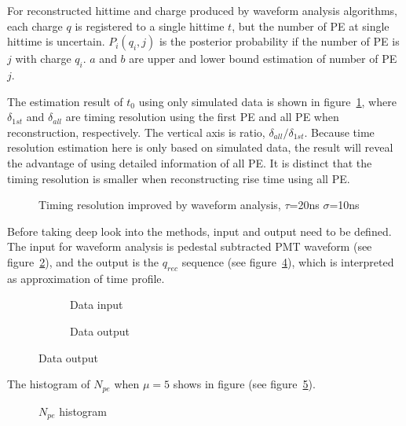 For reconstructed hittime and charge produced by waveform analysis algorithms, each charge $q$ is registered to a single hittime $t$, but the number of PE at single hittime is uncertain. $P_{i}(q_{i},j)$ is the posterior probability if the number of PE is $j$ with charge $q_{i}$. $a$ and $b$ are upper and lower bound estimation of number of PE $j$. 

The estimation result of $t_{0}$ using only simulated data is shown in figure~\ref{fig:reso-diff}, where $\delta_{1st}$ and $\delta_{all}$ are timing resolution using the first PE and all PE when reconstruction, respectively. The vertical axis is ratio, $\delta_{all}/\delta_{1st}$. Because time resolution estimation here is only based on simulated data, the result will reveal the advantage of using detailed information of all PE. It is distinct that the timing resolution is smaller when reconstructing rise time using all PE. 

\begin{figure}[H]
    \centering
    \scalebox{0.5}{}
    \caption{\label{fig:reso-diff} Timing resolution improved by waveform analysis, $\tau$=20ns $\sigma$=10ns}
\end{figure}

Before taking deep look into the methods, input and output need to be defined. The input for waveform analysis is pedestal subtracted PMT waveform (see figure~\ref{fig:input}), and the output is the $q_{rec}$ sequence (see figure~\ref{fig:output}), which is interpreted as approximation of time profile.

\begin{figure}[H]
\begin{minipage}[b]{.5\textwidth}
\begin{figure}[H]
    \centering
    \resizebox{\textwidth}{!}{}
    \caption{\label{fig:input} Data input}
\end{figure}
\end{minipage}
\begin{minipage}[b]{.5\textwidth}
\begin{figure}[H]
    \centering
    \resizebox{\textwidth}{!}{}
    \caption{\label{fig:output} Data output}
\end{figure}
\end{minipage}
\end{figure}

The histogram of $N_{pe}$ when $\mu=5$ shows in figure (see figure~\ref{fig:penum}). 

\begin{figure}[H]
    \centering
    \scalebox{0.4}{}
    \caption{\label{fig:penum} $N_{pe}$ histogram}
\end{figure}

